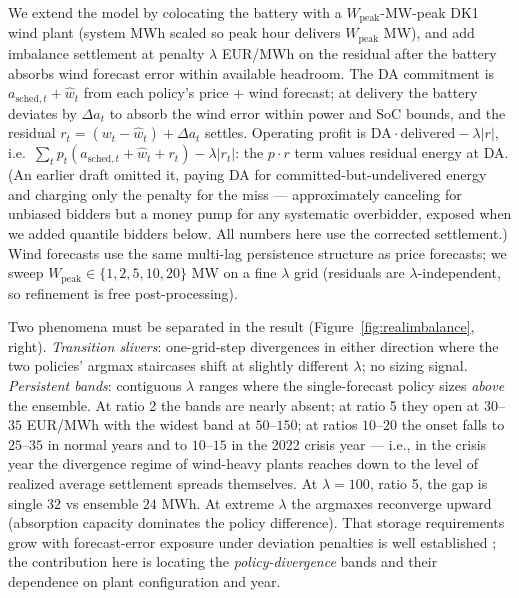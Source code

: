 \documentclass[11pt]{article}
\begin{document}
We extend the model by colocating the battery with a $W_{\mathrm{peak}}$-MW-peak DK1 wind plant (system MWh scaled so peak hour delivers $W_{\mathrm{peak}}$ MW), and add imbalance settlement at penalty $\lambda$ EUR/MWh on the residual after the battery absorbs wind forecast error within available headroom. The DA commitment is $a_{\mathrm{sched},t} + \hat{w}_t$ from each policy's price + wind forecast; at delivery the battery deviates by $\Delta a_t$ to absorb the wind error within power and SoC bounds, and the residual $r_t = (w_t - \hat{w}_t) + \Delta a_t$ settles. Operating profit is $\mathrm{DA} \cdot \mathrm{delivered} - \lambda |r|$, i.e.\ $\sum_t p_t (a_{\mathrm{sched},t} + \hat w_t + r_t) - \lambda |r_t|$: the $p \cdot r$ term values residual energy at DA. (An earlier draft omitted it, paying DA for committed-but-undelivered energy and charging only the penalty for the miss --- approximately canceling for unbiased bidders but a money pump for any systematic overbidder, exposed when we added quantile bidders below. All numbers here use the corrected settlement.) Wind forecasts use the same multi-lag persistence structure as price forecasts; we sweep $W_{\mathrm{peak}} \in \{1, 2, 5, 10, 20\}$ MW on a fine $\lambda$ grid (residuals are $\lambda$-independent, so refinement is free post-processing).

Two phenomena must be separated in the result (Figure~\ref{fig:realimbalance}, right). \emph{Transition slivers}: one-grid-step divergences in either direction where the two policies' argmax staircases shift at slightly different $\lambda$; no sizing signal. \emph{Persistent bands}: contiguous $\lambda$ ranges where the single-forecast policy sizes \emph{above} the ensemble. At ratio 2 the bands are nearly absent; at ratio 5 they open at $30$--$35$ EUR/MWh with the widest band at $50$--$150$; at ratios $10$--$20$ the onset falls to $25$--$35$ in normal years and to $10$--$15$ in the 2022 crisis year --- i.e., in the crisis year the divergence regime of wind-heavy plants reaches down to the level of realized average settlement spreads themselves. At $\lambda = 100$, ratio 5, the gap is single $32$ vs ensemble $24$ MWh. At extreme $\lambda$ the argmaxes reconverge upward (absorption capacity dominates the policy difference). That storage requirements grow with forecast-error exposure under deviation penalties is well established \citep{bludszuweit2011probabilistic, haessig2015storage, mokhtare2024offshore}; the contribution here is locating the \emph{policy-divergence} bands and their dependence on plant configuration and year.
\end{document}
